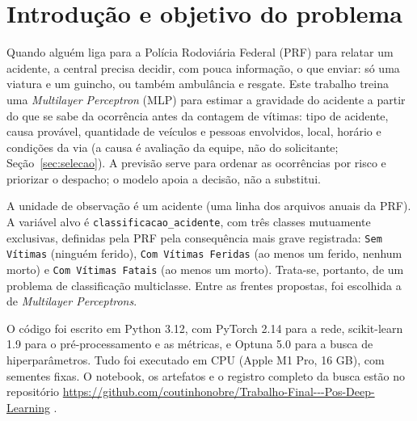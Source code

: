 \chapter{Introdução e objetivo do problema}
\label{cap:intro}

Quando alguém liga para a Polícia Rodoviária Federal (PRF) para relatar um acidente, a central precisa decidir, com pouca informação, o que enviar: só uma viatura e um guincho, ou também ambulância e resgate. Este trabalho treina uma \textit{Multilayer Perceptron} (MLP) para estimar a gravidade do acidente a partir do que se sabe da ocorrência antes da contagem de vítimas: tipo de acidente, causa provável, quantidade de veículos e pessoas envolvidos, local, horário e condições da via (a causa é avaliação da equipe, não do solicitante; Seção~\ref{sec:selecao}). A previsão serve para ordenar as ocorrências por risco e priorizar o despacho; o modelo apoia a decisão, não a substitui.

A unidade de observação é um acidente (uma linha dos arquivos anuais da PRF). A variável alvo é \texttt{classificacao\_acidente}, com três classes mutuamente exclusivas, definidas pela PRF pela consequência mais grave registrada: \texttt{Sem Vítimas} (ninguém ferido), \texttt{Com Vítimas Feridas} (ao menos um ferido, nenhum morto) e \texttt{Com Vítimas Fatais} (ao menos um morto). Trata-se, portanto, de um problema de classificação multiclasse. Entre as frentes propostas, foi escolhida a de \textit{Multilayer Perceptrons}.

O código foi escrito em Python 3.12, com PyTorch 2.14 para a rede, scikit-learn 1.9 para o pré-processamento e as métricas, e Optuna 5.0 para a busca de hiperparâmetros. Tudo foi executado em CPU (Apple M1 Pro, 16 GB), com sementes fixas. O notebook, os artefatos e o registro completo da busca estão no repositório \url{https://github.com/coutinhonobre/Trabalho-Final---Pos-Deep-Learning} \cite{nobre2026}.
